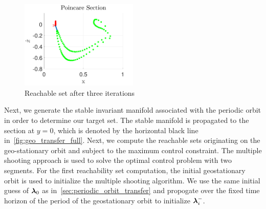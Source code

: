 \documentclass[smallcondensed]{svjour3}
\begin{document}
\begin{figure}[htbp]
   \centering
   \includegraphics[width=0.5\textwidth]{third_reachability_set} %
   \caption{Reachable set after three iterations}
   \label{fig:third_reachability_set}
\end{figure}
Next, we generate the stable invariant manifold associated with the periodic orbit in order to determine our target set.
The stable manifold is propagated to the \Poincare section at \( y = 0 \), which is denoted by the horizontal black line in~\cref{fig:geo_transfer_full}.
Next, we compute the reachable sets originating on the geo-stationary orbit and subject to the maximum control constraint. 
The multiple shooting approach is used to solve the optimal control problem with two segments.
For the first reachability set computation, the initial geostationary orbit is used to initialize the multiple shooting algorithm.
We use the same initial guess of \( \bm{\lambda}_0\) as in~\cref{sec:periodic_orbit_transfer} and propogate over the fixed time horizon of the period of the geostationary orbit to initialize \( \bm{\lambda}_i^{-}\).
\end{document}
